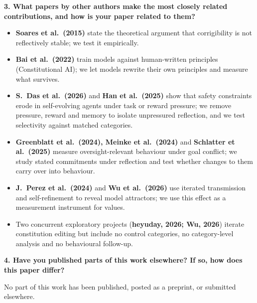 \documentclass[11pt]{article}
\begin{document}
\textbf{3. What papers by other authors make the most closely related contributions, and how is your paper related to them?}
\begin{itemize}[leftmargin=*]
\item \textbf{Soares et al.\ (2015)} state the theoretical argument that corrigibility is not reflectively stable; we test it empirically.
\item \textbf{Bai et al.\ (2022)} train models against human-written principles (Constitutional AI); we let models rewrite their own principles and measure what survives.
\item \textbf{S.\ Das et al.\ (2026)} and \textbf{Han et al.\ (2025)} show that safety constraints erode in self-evolving agents under task or reward pressure; we remove pressure, reward and memory to isolate unpressured reflection, and we test selectivity against matched categories.
\item \textbf{Greenblatt et al.\ (2024), Meinke et al.\ (2024)} and \textbf{Schlatter et al.\ (2025)} measure oversight-relevant behaviour under goal conflict; we study stated commitments under reflection and test whether changes to them carry over into behaviour.
\item \textbf{J.\ Perez et al.\ (2024)} and \textbf{Wu et al.\ (2026)} use iterated transmission and self-refinement to reveal model attractors; we use this effect as a measurement instrument for values.
\item Two concurrent exploratory projects (\textbf{heyuday, 2026; Wu, 2026}) iterate constitution editing but include no control categories, no category-level analysis and no behavioural follow-up.
\end{itemize}

\textbf{4. Have you published parts of this work elsewhere? If so, how does this paper differ?}

No part of this work has been published, posted as a preprint, or submitted elsewhere.
\end{document}
